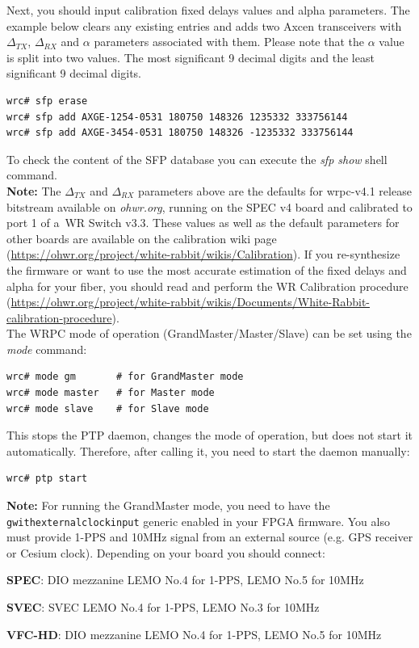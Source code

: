\documentclass[a4paper, 12pt]{article}
\renewcommand{\_}{\underscore\allowbreak}
\begin{document}
Next, you should input calibration fixed delays values and alpha parameters. The
example below clears any existing entries and adds two Axcen transceivers with
$\Delta_{TX}$, $\Delta_{RX}$ and $\alpha$ parameters associated with them.
Please note that the $\alpha$ value is split into two values. The most
significant 9 decimal digits and the least significant 9 decimal digits.

\begin{lstlisting}
wrc# sfp erase
wrc# sfp add AXGE-1254-0531 180750 148326 1235332 333756144
wrc# sfp add AXGE-3454-0531 180750 148326 -1235332 333756144
\end{lstlisting}

To check the content of the SFP database you can execute the \textit{sfp show}
shell command.\\

\noindent\textbf{Note:} The $\Delta_{TX}$ and $\Delta_{RX}$ parameters above are
the defaults for wrpc-v4.1 release bitstream available on \textit{ohwr.org},
running on the SPEC v4 board and calibrated to port 1 of a~WR Switch
v3.3. These values as well as the default parameters for other boards are
available on the calibration wiki page
(\url{https://ohwr.org/project/white-rabbit/wikis/Calibration}). If you
re-synthesize the firmware or want to use the most accurate estimation of
the fixed delays and alpha for your fiber, you should read and perform the WR
Calibration procedure
(\url{https://ohwr.org/project/white-rabbit/wikis/Documents/White-Rabbit-calibration-procedure}).\\

The WRPC  mode of operation (GrandMaster/Master/Slave) can be set
using the \textit{mode} command:

\begin{lstlisting}
wrc# mode gm       # for GrandMaster mode
wrc# mode master   # for Master mode
wrc# mode slave    # for Slave mode
\end{lstlisting}

This stops the PTP daemon, changes the mode of operation, but does not start it
automatically. Therefore, after calling it, you need to start the daemon
manually:

\begin{lstlisting}
wrc# ptp start
\end{lstlisting}

\noindent\textbf{Note:} For running the GrandMaster mode, you need to have the
\texttt{g\_with\_external\_clock\_input} generic enabled in your FPGA firmware.
You also must provide 1-PPS and 10MHz signal from an external source (e.g. GPS receiver or
Cesium clock). Depending on your board you should connect:
\begin{itemize*}
  \item \textbf{SPEC}: DIO mezzanine LEMO No.4 for 1-PPS, LEMO No.5 for 10MHz
  \item \textbf{SVEC}: SVEC LEMO No.4 for 1-PPS, LEMO No.3 for 10MHz
  \item \textbf{VFC-HD}: DIO mezzanine LEMO No.4 for 1-PPS, LEMO No.5 for 10MHz
\end{itemize*}
\end{document}
